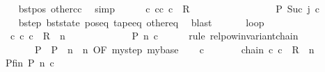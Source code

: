 \begin{isabellebody}
\ \ \ \ \ \ \isamarkupfalse%
\ bst{\isacharunderscore}{\kern0pt}pos\ other{\isacharunderscore}{\kern0pt}cc\ \isamarkupfalse%
\ simp\isanewline
\ \ \ \ \isamarkupfalse%
\ {\isachardoublequoteopen}{\isasymexists}c{\isacharprime}{\kern0pt}{\isacharprime}{\kern0pt}{\isachardot}{\kern0pt}\ {\isacharparenleft}{\kern0pt}cc{\isacharcomma}{\kern0pt}\ c{\isacharprime}{\kern0pt}{\isacharprime}{\kern0pt}{\isacharparenright}{\kern0pt}\ {\isasymin}\ R{\isacharprime}{\kern0pt}\isanewline
\ \ \ \ \ \ \ \ \ \ \ \ \ \ \ \ {\isasymand}\ {\isacharquery}{\kern0pt}P\ {\isacharparenleft}{\kern0pt}Suc\ j{\isacharparenright}{\kern0pt}\ c{\isacharprime}{\kern0pt}{\isacharprime}{\kern0pt}{\isachardoublequoteclose}\isanewline
\ \ \ \ \ \ \isamarkupfalse%
\ bstep\ bst{\isacharunderscore}{\kern0pt}state\ pos{\isacharunderscore}{\kern0pt}eq\ tape{\isacharunderscore}{\kern0pt}eq\ other{\isacharunderscore}{\kern0pt}eq\ \isamarkupfalse%
\ blast\isanewline
\ \ \isamarkupfalse%
\isanewline
\ \ \isamarkupfalse%
\ loop{\isacharcolon}{\kern0pt}\isanewline
\ \ \ \ \ \ {\isachardoublequoteopen}{\isasymexists}c{\isacharprime}{\kern0pt}{\isachardot}{\kern0pt}\ {\isacharparenleft}{\kern0pt}c{}{\isacharcomma}{\kern0pt}\ c{\isacharprime}{\kern0pt}{\isacharparenright}{\kern0pt}\ {\isasymin}\ R{\isacharprime}{\kern0pt}\ {\isacharcircum}{\kern0pt}{\isacharcircum}{\kern0pt}\ n\isanewline
\ \ \ \ \ \ \ \ \ \ \ \ {\isasymand}\ {\isacharquery}{\kern0pt}P\ n\ c{\isacharprime}{\kern0pt}{\isachardoublequoteclose}\isanewline
\ \ \ \ \isamarkupfalse%
\ {\isacharparenleft}{\kern0pt}rule\ relpow{\isacharunderscore}{\kern0pt}invariant{\isacharunderscore}{\kern0pt}chain\isanewline
\ \ \ \ \ \ \ \ \ \ {\isacharbrackleft}{\kern0pt}\ P\ {\isacharequal}{\kern0pt}\ {\isacharquery}{\kern0pt}P\ \ n\ {\isacharequal}{\kern0pt}\ n{\isacharcomma}{\kern0pt}\ OF\ mystep\ mybase{\isacharbrackright}{\kern0pt}{\isacharparenright}{\kern0pt}\isanewline
\ \ \isamarkupfalse%
\ c{\isacharprime}{\kern0pt}\ \isanewline
\ \ \ \ \ \ chain{\isacharcolon}{\kern0pt}\ {\isachardoublequoteopen}{\isacharparenleft}{\kern0pt}c{}{\isacharcomma}{\kern0pt}\ c{\isacharprime}{\kern0pt}{\isacharparenright}{\kern0pt}\ {\isasymin}\ R{\isacharprime}{\kern0pt}\ {\isacharcircum}{\kern0pt}{\isacharcircum}{\kern0pt}\ n{\isachardoublequoteclose}\isanewline
\ \ \ \ \ Pfin{\isacharcolon}{\kern0pt}\ {\isachardoublequoteopen}{\isacharquery}{\kern0pt}P\ n\ c{\isacharprime}{\kern0pt}{\isachardoublequoteclose}\isanewline

\end{isabellebody}

